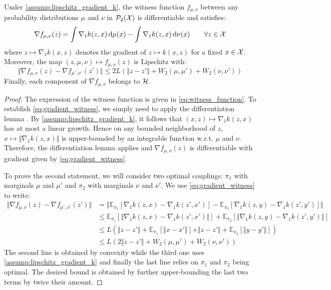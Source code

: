 \begin{proposition}\label{prop:grad_witness_function}
Under \cref{assump:lipschitz_gradient_k}, the witness function $f_{\mu,\nu}$ between any probability distributions $\mu$ and $\nu$ in $\mathcal{P}_2({{\mathcal X}})$ is differentiable and satisfies:
\begin{equation}\label{eq:gradient_witness}
\nabla f_{\mu,\nu}(z) = \int \nabla_1 k(z,x)\mathop{}\!\mathrm{d} \mu(x) - \int \nabla_1 k(z,x)\mathop{}\!\mathrm{d} \nu(x) \qquad \forall z\in {{\mathcal X}}
\end{equation}
where $z \mapsto \nabla_1 k(x,z)$ denotes the gradient of $z\mapsto k(x,z)$ for a fixed $x \in {{\mathcal X}}$.
 Moreover, the map $(z,\mu,\nu)\mapsto f_{\mu,\nu}(z)$ is Lipschitz with:
\begin{equation}\label{eq:lipschitz_grad_witness}
\Vert \nabla f_{\mu,\nu}(z) - \nabla f_{\mu',\nu'}(z')\Vert \leq 2L (\Vert z-z' \Vert + W_2(\mu,\mu') + W_2(\nu,\nu')) 
\end{equation}
Finally, each component of $\nabla f_{\mu,\nu}$ belongs to ${{\mathcal H}}$.
\end{proposition}
\begin{proof}
	The expression of the witness function is given in \eqref{eq:witness_function}. To establish \eqref{eq:gradient_witness}, we simply need to apply the differentiation lemma \cite[Theorem 6.28]{Klenke:2008}. By \cref{assump:lipschitz_gradient_k}, it follows that $ (x,z)\mapsto \nabla_1 k(z,x)$ has at most a linear growth. Hence on any bounded neighborhood of $z$, $x\mapsto \Vert \nabla_1 k(z,x) \Vert $ is upper-bounded by an integrable function w.r.t. $\mu$ and $\nu$. Therefore, the differentiation lemma applies and  $\nabla f_{\mu,\nu}(z)$ is differentiable with gradient given by \cref{eq:gradient_witness}.
	
	To prove the second statement, we will consider two optimal couplings: $\pi_1$ with marginals $\mu$ and $\mu'$ and $\pi_2$ with marginals $\nu$ and $\nu'$.  We use \cref{eq:gradient_witness} to write:
	\begin{align*}
		\Vert \nabla f_{\mu,\nu}(z) - \nabla f_{\mu',\nu'}(z')\Vert 
		&= \Vert \mathbb{E}_{\pi_1}[ \nabla_1 k(z,x)-\nabla_1 k(z',x') ] - \mathbb{E}_{\pi_2}[\nabla_1 k(z,y)-\nabla_1 k(z',y')] \Vert\\
		& \leq
		\mathbb{E}_{\pi_1}[ \Vert  \nabla_1 k(z,x)-\nabla_1 k(z',x') \Vert ] + \mathbb{E}_{\pi_2}[\Vert  \nabla_1 k(z,y)-\nabla_1 k(z',y') \Vert ] \\
		&\leq
		L\left( \Vert  z-z' \Vert + \mathbb{E}_{\pi_1}[\Vert  x-x' \Vert]  +  \Vert  z-z' \Vert + \mathbb{E}_{\pi_2}[\Vert  y-y' \Vert ] \right)\\
		&\leq L(2\Vert z-z'\Vert + W_2(\mu,\mu')  + W_2(\nu,\nu') )
	\end{align*}
	The second line is obtained by convexity while the third one uses \cref{assump:lipschitz_gradient_k} and finally the last line relies on $\pi_1$ and $\pi_2$ being optimal. The desired bound is obtained by further upper-bounding the last two terms by twice their amount.
\end{proof}

